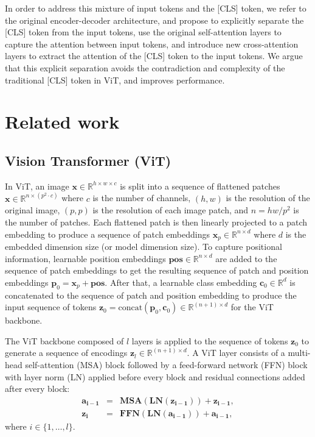 \documentclass[anon,12pt]{colt2024} %
\begin{document}
In order to address this mixture of input tokens and the [CLS] token, we refer to the original encoder-decoder architecture, and propose to explicitly separate the [CLS] token from the input tokens, use the original self-attention layers to capture the attention between input tokens, and introduce new cross-attention layers to extract the attention of the [CLS] token to the input tokens.
We argue that this explicit separation avoids the contradiction and complexity of the traditional [CLS] token in ViT, and improves performance.

\section{Related work}

\subsection{Vision Transformer (ViT)}
In ViT, an image $\mathbf{x} \in \mathbb{R} ^ {h \times w \times c}$ is split into a sequence of flattened patches $\mathbf{x} \in \mathbb{R} ^ {n \times (p^2 \cdot c)}$ where $c$ is the number of channels, $(h,w)$ is the resolution of the original image, $(p,p)$ is the resolution of each image patch, and $n=hw/p^2$ is the number of patches.
Each flattened patch is then linearly projected to a patch embedding to produce a sequence of patch embeddings $\mathbf{x}_p \in \mathbb{R} ^ {n \times d}$ where $d$ is the embedded dimension size (or model dimension size).
To capture positional information, learnable position embeddings $\mathbf{pos} \in \mathbb{R} ^ {n \times d}$ are added to the sequence of patch embeddings to get the resulting sequence of patch and position embeddings $\mathbf{p}_0 = \mathbf{x}_p + \mathbf{pos}$.
After that, a learnable class embedding $\mathbf{c}_0 \in \mathbb{R}^d$ is concatenated to the sequence of patch and position embedding to produce the input sequence of tokens $\mathbf{z}_0 = \mathrm{concat}(\mathbf{p}_0,  \mathbf{c}_0) \in \mathbb{R} ^ {(n+1) \times d}$ for the ViT backbone.

The ViT backbone composed of $l$ layers is applied to the sequence of tokens $\mathbf{z}_0$ to generate a sequence of encodings $\mathbf{z}_l \in \mathbb{R} ^ {(n+1) \times d}$.
A ViT layer consists of a multi-head self-attention (MSA) block followed by a feed-forward network (FFN) block with layer norm (LN) applied before every block and residual connections added after every block:
\begin{eqnarray}
  \mathbf{a_{i-1}} &=& \mathbf{MSA}(\mathbf{LN}(\mathbf{z_{i-1}})) + \mathbf{z_{i-1}} , \\
  \mathbf{z_{i}} &=& \mathbf{FFN}(\mathbf{LN}(\mathbf{a_{i-1}})) + \mathbf{a_{i-1}},
\end{eqnarray}
where $i \in \{1,\ldots,l\}$.
\end{document}
